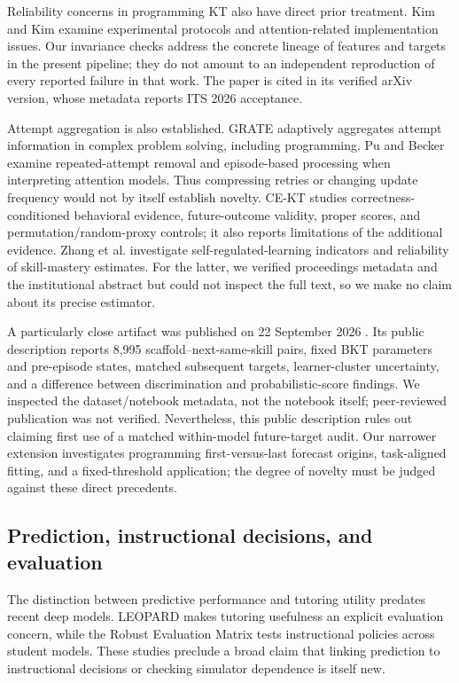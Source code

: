 \documentclass[11pt]{article}
\newcommand{\1}{\mathbb{I}}
\begin{document}
Reliability concerns in programming KT also have direct prior treatment. Kim and Kim \cite{kim2026reliability} examine experimental protocols and attention-related implementation issues. Our invariance checks address the concrete lineage of features and targets in the present pipeline; they do not amount to an independent reproduction of every reported failure in that work. The paper is cited in its verified arXiv version, whose metadata reports ITS 2026 acceptance.

Attempt aggregation is also established. GRATE \cite{wang2021grate} adaptively aggregates attempt information in complex problem solving, including programming. Pu and Becker \cite{pu2022selfattention} examine repeated-attempt removal and episode-based processing when interpreting attention models. Thus compressing retries or changing update frequency would not by itself establish novelty. CE-KT \cite{zhao2026cekt} studies correctness-conditioned behavioral evidence, future-outcome validity, proper scores, and permutation/random-proxy controls; it also reports limitations of the additional evidence. Zhang et al. \cite{zhang2026mastery} investigate self-regulated-learning indicators and reliability of skill-mastery estimates. For the latter, we verified proceedings metadata and the institutional abstract but could not inspect the full text, so we make no claim about its precise estimator.

A particularly close artifact was published on 22 September 2026 \cite{hoa2026stepbkt}. Its public description reports 8,995 scaffold--next-same-skill pairs, fixed BKT parameters and pre-episode states, matched subsequent targets, learner-cluster uncertainty, and a difference between discrimination and probabilistic-score findings. We inspected the dataset/notebook metadata, not the notebook itself; peer-reviewed publication was not verified. Nevertheless, this public description rules out claiming first use of a matched within-model future-target audit. Our narrower extension investigates programming first-versus-last forecast origins, task-aligned fitting, and a fixed-threshold application; the degree of novelty must be judged against these direct precedents.

\subsection{Prediction, instructional decisions, and evaluation}
The distinction between predictive performance and tutoring utility predates recent deep models. LEOPARD \cite{gonzalezbrenes2015leopard} makes tutoring usefulness an explicit evaluation concern, while the Robust Evaluation Matrix \cite{doroudi2017rem} tests instructional policies across student models. These studies preclude a broad claim that linking prediction to instructional decisions or checking simulator dependence is itself new.
\end{document}
